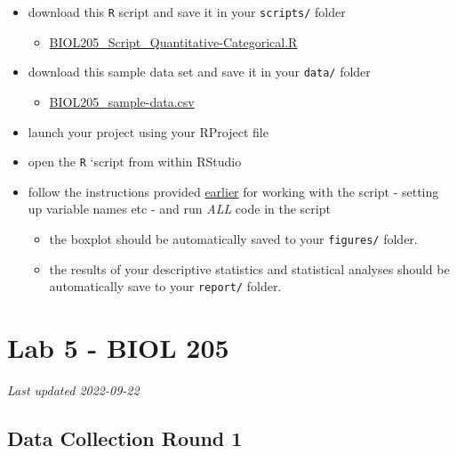 \documentclass[
]{book}
\providecommand{\tightlist}{%
  \setlength{\itemsep}{0pt}\setlength{\parskip}{0pt}}
\begin{document}
\begin{itemize}
\tightlist
\item
  download this \texttt{R} script and save it in your \texttt{scripts/} folder

  \begin{itemize}
  \tightlist
  \item
    \href{https://osf.io/download/46mpk}{BIOL205\_Script\_Quantitative-Categorical.R}
  \end{itemize}
\item
  download this sample data set and save it in your \texttt{data/} folder

  \begin{itemize}
  \tightlist
  \item
    \href{https://osf.io/download/3r76k}{BIOL205\_sample-data.csv}
  \end{itemize}
\item
  launch your project using your RProject file
\item
  open the \texttt{R} `script from within RStudio
\item
  follow the instructions provided \href{https://ubco-biology.github.io/BIOL-205-Lab-Manual/using-the-rscripts.html}{earlier} for working with the script - setting up variable names etc - and run \emph{ALL} code in the script

  \begin{itemize}
  \tightlist
  \item
    the boxplot should be automatically saved to your \texttt{figures/} folder.
  \item
    the results of your descriptive statistics and statistical analyses should be automatically save to your \texttt{report/} folder.
  \end{itemize}
\end{itemize}

\hypertarget{part-lab-5---biol-205}{%
\part*{Lab 5 - BIOL 205}\label{part-lab-5---biol-205}}

\emph{Last updated 2022-09-22}

\hypertarget{data-collection-round-1}{%
\chapter*{Data Collection Round 1}\label{data-collection-round-1}}
\end{document}
